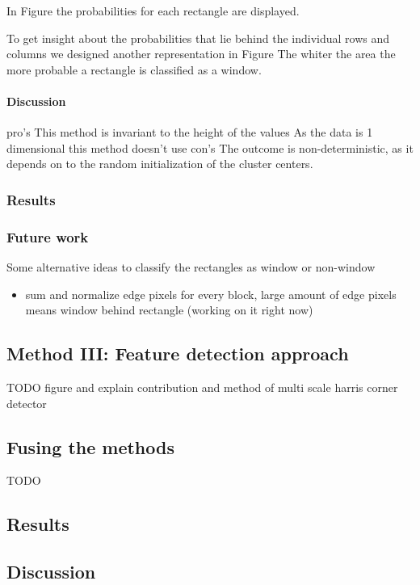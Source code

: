 In Figure %
the probabilities for each rectangle are displayed.

To get insight about the probabilities that lie behind the individual rows and columns
we designed another representation in Figure %
The whiter the area the more probable a rectangle is classified as a window.

\paragraph{Discussion}
pro's 
This method is invariant to the height of the values
As the data is 1 dimensional this method doesn't use 
con's
The outcome is non-deterministic, as it depends on to the random initialization of the cluster centers.


	 


\subsubsection{Results}

\subsubsection{Future work}
Some alternative ideas to classify the rectangles as window or non-window
\begin{itemize}
	\item sum and normalize edge pixels for every block, large amount of edge pixels means window behind rectangle (working on it right now)
\end{itemize}


\subsection{Method III: Feature detection approach}
	TODO figure and explain contribution and method of multi scale harris corner detector

\subsection{Fusing the methods}
	TODO

\subsection{Results}
\subsection{Discussion}  %
